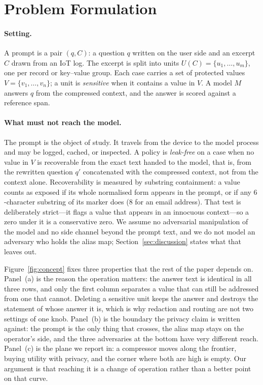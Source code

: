 \section{Problem Formulation}
\label{sec:problem}

\paragraph{Setting.}
A prompt is a pair $(q, C)$: a question $q$ written on the user side and an excerpt $C$
drawn from an IoT log. The excerpt is split into units $U(C)=\{u_1,\dots,u_m\}$, one per
record or key--value group. Each case carries a set of protected values
$V=\{v_1,\dots,v_n\}$; a unit is \emph{sensitive} when it contains a value in $V$. A model
$M$ answers $q$ from the compressed context, and the answer is scored against a reference
span.

\paragraph{What must not reach the model.}
The prompt is the object of study. It travels from the device to the model process and may
be logged, cached, or inspected. A policy is \emph{leak-free} on a case when no value in $V$
is recoverable from the exact text handed to the model, that is, from the rewritten question
$q'$ concatenated with the compressed context, not from the context alone. Recoverability is
measured by substring containment: a value counts as exposed if its whole normalised form appears in
the prompt, or if any $6$-character substring of its marker does ($8$ for an email address). That test is deliberately
strict---it flags a value that appears in an innocuous context---so a zero under it is a conservative
zero. We
assume no adversarial manipulation of the model and no side channel beyond the prompt text,
and we do not model an adversary who holds the alias map; Section~\ref{sec:discussion}
states what that leaves out.

Figure~\ref{fig:concept} fixes three properties that the rest of the paper depends on. Panel~(a)
is the reason the operation matters: the answer text is identical in all three rows, and only
the first column separates a value that can still be addressed from one that cannot. Deleting a
sensitive unit keeps the answer and destroys the statement of whose answer it is, which is why
redaction and routing are not two settings of one knob. Panel~(b) is the boundary the privacy
claim is written against: the prompt is the only thing that crosses, the alias map stays on the
operator's side, and the three adversaries at the bottom have very different reach. Panel~(c)
is the plane we report in: a compressor moves along the frontier, buying utility with privacy,
and the corner where both are high is empty. Our argument is that reaching it is a change of
operation rather than a better point on that curve.

